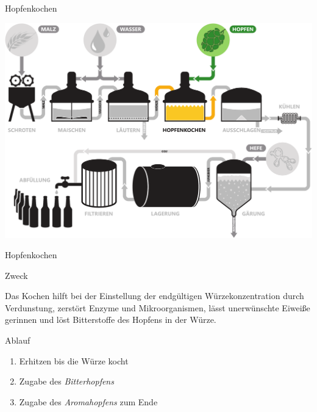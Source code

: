 \documentclass[9pt, ngerman]{beamer}
\begin{document}
\begin{frame}{Hopfenkochen}
  \begin{center}
    \vspace{0.5cm}
    \includegraphics[width=\textwidth]{pdfs/prozess-hopfenkochen.pdf}
  \end{center}
\end{frame}
\begin{frame}{Hopfenkochen}
  \begin{block}{Zweck}
    \vspace{0.5em}

    Das Kochen hilft bei der Einstellung der endgültigen Würzekonzentration
    durch Verdunstung, zerstört Enzyme und Mikroorganismen, lässt unerwünschte
    Eiweiße gerinnen und löst Bitterstoffe des Hopfens in der Würze.

  \end{block}

  \begin{block}{Ablauf}
    \begin{enumerate}
      \item Erhitzen bis die Würze kocht
      \item Zugabe des \emph{Bitterhopfens}
      \item Zugabe des \emph{Aromahopfens} zum Ende
    \end{enumerate}
  \end{block}
\end{frame}
\end{document}
